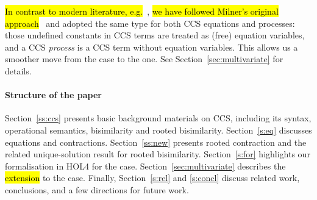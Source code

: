 \hl{In contrast to modern literature, e.g.}~\cite{Gorrieri:2015jt},
\hl{we have followed Milner's original approach}~\cite{milner1990operational} and adopted the same
type for both CCS equations and processes: those undefined constants
in CCS terms are treated as  (free) equation variables, and a CCS
\emph{process} is a CCS term without equation variables. 
This allows us a smoother move from the \univariate case to the \multivariate
one. See Section~\ref{sec:multivariate} for  details.

\paragraph{Structure of the paper}

Section~\ref{ss:ccs} presents basic background materials on CCS,
including its syntax, operational semantics, bisimilarity and rooted
bisimilarity.
Section~\ref{s:eq} discusses equations and contractions.
Section~\ref{ss:new} presents rooted contraction and the related
unique-solution result for rooted bisimilarity.
Section~\ref{s:for} highlights our formalisation in HOL4 for the
\univariate case.
Section~\ref{sec:multivariate} describes the \hl{extension} to the
  \multivariate case.
Finally,  Section~\ref{s:rel} and \ref{s:concl} discuss related work,
conclusions, and a few directions for future work.

